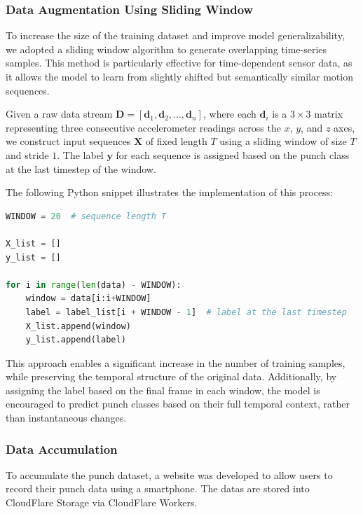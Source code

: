\documentclass{article}
\begin{document}
\subsubsection{Data Augmentation Using Sliding Window}

To increase the size of the training dataset and improve model generalizability, we adopted a sliding window algorithm to generate overlapping time-series samples. This method is particularly effective for time-dependent sensor data, as it allows the model to learn from slightly shifted but semantically similar motion sequences.

Given a raw data stream $\mathbf{D} = [\mathbf{d}_1, \mathbf{d}_2, ..., \mathbf{d}_n]$, where each $\mathbf{d}_i$ is a $3 \times 3$ matrix representing three consecutive accelerometer readings across the $x$, $y$, and $z$ axes, we construct input sequences $\mathbf{X}$ of fixed length $T$ using a sliding window of size $T$ and stride $1$. The label $\mathbf{y}$ for each sequence is assigned based on the punch class at the last timestep of the window.

The following Python snippet illustrates the implementation of this process:

\begin{lstlisting}[language=Python, caption={Sliding window algorithm for data augmentation}]
WINDOW = 20  # sequence length T

X_list = []
y_list = []

for i in range(len(data) - WINDOW):
    window = data[i:i+WINDOW]
    label = label_list[i + WINDOW - 1]  # label at the last timestep
    X_list.append(window)
    y_list.append(label)
\end{lstlisting}

This approach enables a significant increase in the number of training samples, while preserving the temporal structure of the original data. Additionally, by assigning the label based on the final frame in each window, the model is encouraged to predict punch classes based on their full temporal context, rather than instantaneous changes.






\subsubsection{Data Accumulation}
To accumulate the punch dataset, a website was developed to allow users to record their punch data using a smartphone. The datas are stored into CloudFlare Storage via CloudFlare Workers.
\end{document}
